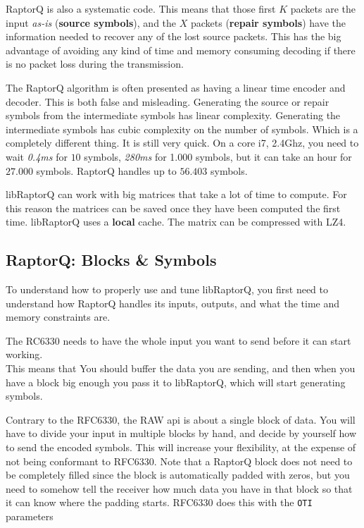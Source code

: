 \documentclass[11pt,a4paper]{refart}
\begin{document}
 RaptorQ is also a systematic code. This means that those first $K$ packets are the input \textit{as-is} (\textbf{source symbols}),
and the $X$ packets (\textbf{repair symbols}) have the information needed to recover any of the lost source packets. This has the big advantage of
avoiding any kind of time and memory consuming decoding if there is no packet loss during the transmission.

 The RaptorQ algorithm is often presented as having a linear time encoder and decoder. This is both false and misleading.
Generating the source or repair symbols from the intermediate symbols has linear complexity. Generating the intermediate symbols has cubic complexity on the
number of symbols. Which is a completely different thing.
It is still very quick. On a core i7, 2.4Ghz, you need to wait \textit{0.4ms} for $10$ symbols, \textit{280ms} for 1.000 symbols, but it can take an hour for $27.000$ symbols.
RaptorQ handles up to $56.403$ symbols.

 libRaptorQ can work with big matrices that take a lot of time to compute. For this reason the matrices can be saved once they have
been computed the first time. libRaptorQ uses a \textbf{local} cache. The matrix can be compressed with LZ4.

\subsection{RaptorQ: Blocks \& Symbols}

To understand how to properly use and tune libRaptorQ, you first need to understand how RaptorQ handles its inputs, outputs, and what the time and memory
constraints are.

The RC6330 needs to have the whole input you want to send before it can start working.\\
This means that You should buffer the data you are sending, and then when you have a block big enough you pass it to libRaptorQ, which will start generating symbols.

Contrary to the RFC6330, the RAW api is about a single block of data. You will have to divide your input in multiple blocks by hand, and decide by yourself how to send the encoded symbols. This will increase your flexibility, at the expense of not being conformant to RFC6330.
Note that a RaptorQ block does not need to be completely filled since the block is automatically padded with zeros, but you need to somehow tell the receiver how much data you have in that block so that it can know where the padding starts. RFC6330 does this with the \texttt{OTI} parameters
\end{document}
